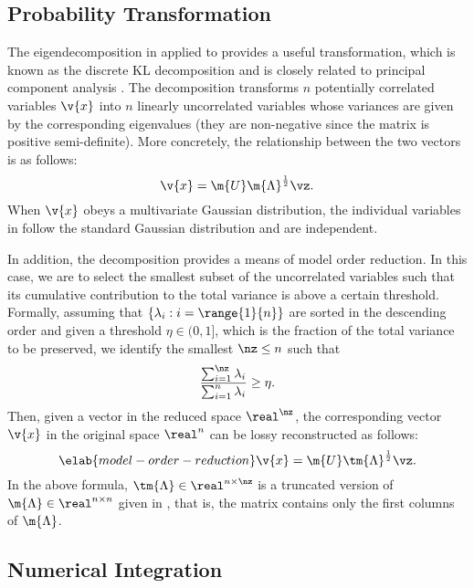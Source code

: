 \subsection{Probability Transformation}

The eigendecomposition in  applied to
 provides a useful transformation, which is known as the
discrete \ac{KL} decomposition \cite{ghanem1991, xiu2010} and is closely related
to principal component analysis \cite{hastie2013}. The decomposition transforms
$n$ potentially correlated variables $\v{x}$ into $n$ linearly uncorrelated
variables \vz whose variances are given by the corresponding eigenvalues (they
are non-negative since the matrix is positive semi-definite). More concretely,
the relationship between the two vectors is as follows:
\[
  \v{x} = \m{U} \m{\Lambda}^\frac{1}{2} \vz.
\]
When $\v{x}$ obeys a multivariate Gaussian distribution, the individual
variables in \vz follow the standard Gaussian distribution and are independent.

In addition, the decomposition provides a means of model order reduction. In
this case, we are to select the smallest subset of the uncorrelated variables
such that its cumulative contribution to the total variance is above a certain
threshold. Formally, assuming that $\{ \lambda_i: i = \range{1}{n} \}$ are
sorted in the descending order and given a threshold $\eta \in (0, 1]$, which is
the fraction of the total variance to be preserved, we identify the smallest
$\nz \leq n$ such that
\[
  \frac{\sum_{i = 1}^\nz \lambda_i}{\sum_{i = 1}^n \lambda_i} \geq \eta.
\]
Then, given a vector \vz in the reduced space $\real^\nz$, the corresponding
vector $\v{x}$ in the original space $\real^n$ can be lossy reconstructed as
follows:
\begin{equation} \elab{model-order-reduction}
  \v{x} = \m{U} \tm{\Lambda}^\frac{1}{2} \vz.
\end{equation}
In the above formula, $\tm{\Lambda} \in \real^{n \times \nz}$ is a truncated
version of $\m{\Lambda} \in \real^{n \times n}$ given in
, that is, the matrix contains only the first \nz
columns of $\m{\Lambda}$.

\subsection{Numerical Integration}

